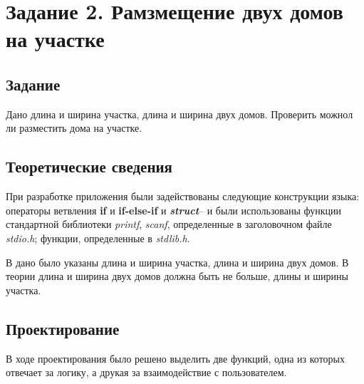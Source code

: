 \documentclass[12pt,a4paper]{report}
\begin{document}
\section{Задание 2. Рамзмещение двух домов на участке}
\subsection{Задание}
\hspace{\parindent}
Дано длина и ширина участка, длина и ширина двух домов. Проверить можнол ли разместить дома на участке.
\subsection{Теоретические сведения}
\hspace{\parindent}
При разработке приложения были задействованы следующие конструкции языка: операторы ветвления \textbf{if} и \textbf{if-else-if} и \textbf{\textit{struct}}-- и были использованы функции стандартной библиотеки \textit{printf}, \textit{scanf}, определенные в заголовочном файле \textit{stdio.h}; функции, определенные в \textit{stdlib.h}.

\hspace{\parindent}
В дано было указаны длина и ширина участка, длина и ширина двух домов. В теории длина и ширина двух домов должна быть не больше, длины и ширины участка.
\subsection{Проектирование}
\hspace{\parindent}
В ходе проектирования было решено выделить две функций, одна из которых отвечает за логику, а друкая за взаимодействие с пользователем.
\end{document}
